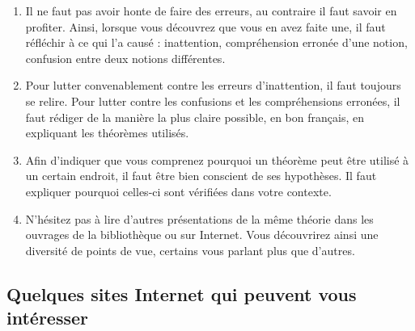\begin{enumerate}
\item Il ne faut pas avoir honte de faire des erreurs, au contraire il faut savoir en  profiter.
    Ainsi, lorsque vous découvrez que vous en avez faite une, il faut réfléchir à ce qui
    l'a causé : inattention, compréhension erronée d'une notion, confusion entre deux
    notions différentes.

\item Pour lutter convenablement contre les erreurs d'inattention, il faut toujours se relire.
    Pour lutter contre les confusions et les compréhensions erronées, il faut rédiger de la
    manière la plus claire possible, en bon français, en expliquant les théorèmes
    utilisés.

\item Afin d'indiquer que vous comprenez pourquoi un théorème peut être utilisé
    à un certain endroit, il faut être bien conscient de ses hypothèses. Il faut expliquer pourquoi
    celles-ci sont vérifiées dans votre contexte.

\item N'hésitez pas à lire d'autres présentations de la même théorie dans les ouvrages
    de la bibliothèque ou sur Internet. Vous découvrirez ainsi une diversité de points de vue,
    certains vous parlant plus que d'autres.
\end{enumerate}

\subsection{Quelques sites Internet qui peuvent vous intéresser}

